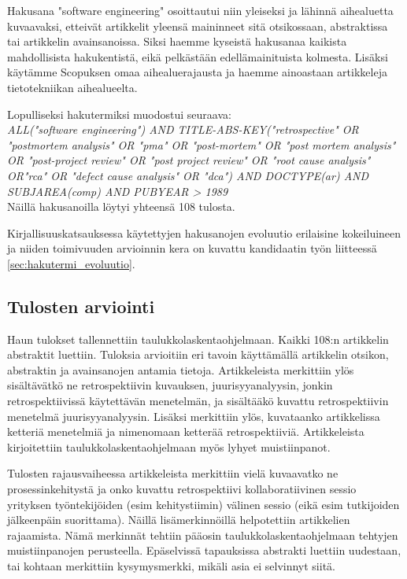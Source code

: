 Hakusana "software engineering" osoittautui niin yleiseksi ja lähinnä aihealuetta kuvaavaksi, etteivät artikkelit yleensä maininneet sitä otsikossaan, abstraktissa tai artikkelin avainsanoissa. Siksi haemme kyseistä hakusanaa kaikista mahdollisista hakukentistä, eikä pelkästään edellämainituista kolmesta. Lisäksi käytämme Scopuksen omaa aihealuerajausta ja haemme ainoastaan artikkeleja tietotekniikan aihealueelta.

Lopulliseksi hakutermiksi muodostui seuraava:\\
\textit{ALL("software engineering") AND TITLE-ABS-KEY("retrospective" OR "postmortem analysis" OR "pma" OR "post-mortem" OR "post mortem analysis" OR "post-project review" OR "post project review" OR "root cause analysis" OR"rca" OR "defect cause analysis" OR "dca") AND DOCTYPE(ar) AND SUBJAREA(comp) AND PUBYEAR > 1989}\\
Näillä hakusanoilla löytyi yhteensä 108 tulosta.

Kirjallisuuskatsauksessa käytettyjen hakusanojen evoluutio erilaisine kokeiluineen ja niiden toimivuuden arvioinnin kera on kuvattu kandidaatin työn liitteessä \ref{sec:hakutermi_evoluutio}.

\subsection{Tulosten arviointi}
Haun tulokset tallennettiin taulukkolaskentaohjelmaan. Kaikki 108:n artikkelin abstraktit luettiin. Tuloksia arvioitiin eri tavoin käyttämällä artikkelin otsikon, abstraktin ja avainsanojen antamia tietoja. Artikkeleista merkittiin ylös sisältävätkö ne retrospektiivin kuvauksen, juurisyyanalyysin, jonkin retrospektiivissä käytettävän menetelmän, ja sisältääkö kuvattu retrospektiivin menetelmä juurisyyanalyysin. Lisäksi merkittiin ylös, kuvataanko artikkelissa ketteriä menetelmiä ja nimenomaan ketterää retrospektiiviä. Artikkeleista kirjoitettiin taulukkolaskentaohjelmaan myös lyhyet muistiinpanot.

Tulosten rajausvaiheessa artikkeleista merkittiin vielä kuvaavatko ne prosessinkehitystä ja onko kuvattu retrospektiivi kollaboratiivinen sessio yrityksen työntekijöiden (esim kehitystiimin) välinen sessio (eikä esim tutkijoiden jälkeenpäin suorittama). Näillä lisämerkinnöillä helpotettiin artikkelien rajaamista. Nämä merkinnät tehtiin pääosin taulukkolaskentaohjelmaan tehtyjen muistiinpanojen perusteella. Epäselvissä tapauksissa abstrakti luettiin uudestaan, tai  kohtaan merkittiin kysymysmerkki, mikäli asia ei selvinnyt siitä.

